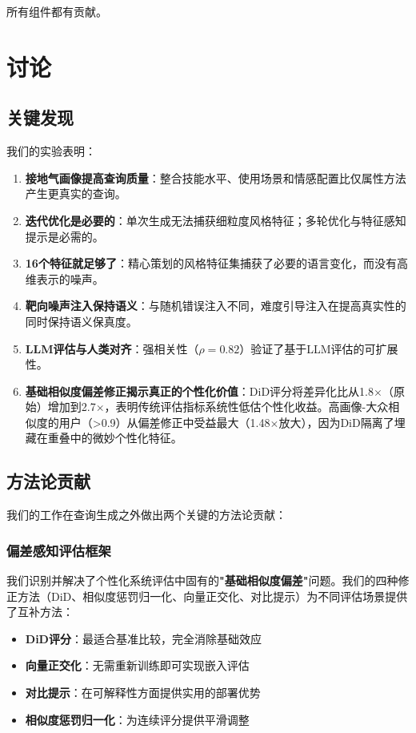 \documentclass[11pt,a4paper]{article}
\begin{document}
所有组件都有贡献。

\section{讨论}

\subsection{关键发现}

我们的实验表明：
\begin{enumerate}
    \item \textbf{接地气画像提高查询质量}：整合技能水平、使用场景和情感配置比仅属性方法产生更真实的查询。
    \item \textbf{迭代优化是必要的}：单次生成无法捕获细粒度风格特征；多轮优化与特征感知提示是必需的。
    \item \textbf{16个特征就足够了}：精心策划的风格特征集捕获了必要的语言变化，而没有高维表示的噪声。
    \item \textbf{靶向噪声注入保持语义}：与随机错误注入不同，难度引导注入在提高真实性的同时保持语义保真度。
    \item \textbf{LLM评估与人类对齐}：强相关性（$\rho=0.82$）验证了基于LLM评估的可扩展性。
    \item \textbf{基础相似度偏差修正揭示真正的个性化价值}：DiD评分将差异化比从1.8$\times$（原始）增加到2.7$\times$，表明传统评估指标系统性低估个性化收益。高画像-大众相似度的用户（>0.9）从偏差修正中受益最大（1.48$\times$放大），因为DiD隔离了埋藏在重叠中的微妙个性化特征。
\end{enumerate}

\subsection{方法论贡献}

我们的工作在查询生成之外做出两个关键的方法论贡献：

\subsubsection{偏差感知评估框架}

我们识别并解决了个性化系统评估中固有的\textbf{"基础相似度偏差"}问题。我们的四种修正方法（DiD、相似度惩罚归一化、向量正交化、对比提示）为不同评估场景提供了互补方法：
\begin{itemize}
    \item \textbf{DiD评分}：最适合基准比较，完全消除基础效应
    \item \textbf{向量正交化}：无需重新训练即可实现嵌入评估
    \item \textbf{对比提示}：在可解释性方面提供实用的部署优势
    \item \textbf{相似度惩罚归一化}：为连续评分提供平滑调整
\end{itemize}
\end{document}
